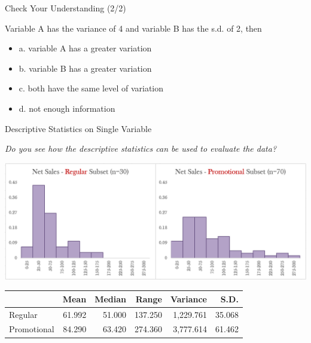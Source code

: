 \documentclass{beamer}
\begin{document}
\begin{frame}{Check Your Understanding (2/2)}

Variable A has the variance of 4 and variable B has the s.d. of 2, then
\begin{itemize}
\item a. variable A has a greater variation
\item b. variable B has a greater variation
\item c. both have the same level of variation
\item d. not enough information
\end{itemize}
\end{frame}

\begin{frame}{Descriptive Statistics on Single Variable}
\begin{center}

\textit{Do you see how the descriptive statistics can be used to evaluate the data?}

\vspace{0.3 cm}

\includegraphics[scale=0.35]{images/ch2NetSalesVarianceTwoGroups.png}



\vspace{0.3 cm}

\begin{scriptsize}
\begin{tabular}{l|r|r|r|r|r}
\hline 
 & Mean & Median & Range & Variance & S.D. \\ 
\hline 
Regular & 61.992 & 51.000 & 137.250 & 1,229.761 & 35.068 \\ 
\hline 
Promotional & 84.290 & 63.420 & 274.360 & 3,777.614 & 61.462 \\ 
\hline 
\end{tabular} 
\end{scriptsize}

\end{center}
\end{frame}
\end{document}

